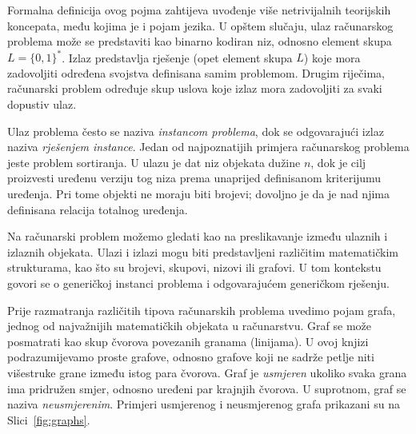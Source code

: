 Formalna definicija ovog pojma zahtijeva uvođenje više netrivijalnih teorijskih koncepata, među kojima je i pojam jezika. U opštem slučaju, ulaz računarskog problema može se predstaviti kao binarno kodiran niz, odnosno element skupa $L=\{0,1\}^*$. Izlaz predstavlja rješenje (opet element skupa $L$) koje mora zadovoljiti određena svojstva definisana samim problemom. Drugim riječima, računarski problem određuje skup uslova koje izlaz mora zadovoljiti za svaki dopustiv ulaz.

Ulaz problema često se naziva \textit{instancom problema}, dok se odgovarajući izlaz naziva \textit{rješenjem instance}. Jedan od najpoznatijih primjera računarskog problema jeste problem sortiranja. U ulazu je dat niz objekata dužine $n$, dok je cilj proizvesti uređenu verziju tog niza prema unaprijed definisanom kriterijumu uređenja. Pri tome objekti ne moraju biti brojevi; dovoljno je da je nad njima definisana relacija totalnog uređenja.

Na računarski problem možemo gledati kao na preslikavanje između ulaznih i izlaznih objekata. Ulazi i izlazi mogu biti predstavljeni različitim matematičkim strukturama, kao što su brojevi, skupovi, nizovi ili grafovi. U tom kontekstu govori se o generičkoj instanci problema i odgovarajućem generičkom rješenju.

Prije razmatranja različitih tipova računarskih problema uvedimo pojam grafa, jednog od najvažnijih matematičkih objekata u računarstvu. Graf se može posmatrati kao skup čvorova povezanih granama (linijama). U ovoj knjizi podrazumijevamo proste grafove, odnosno grafove koji ne sadrže petlje niti višestruke grane između istog para čvorova. Graf je \textit{usmjeren} ukoliko svaka grana ima pridružen smjer, odnosno uređeni par krajnjih čvorova. U suprotnom, graf se naziva \textit{neusmjerenim}. Primjeri usmjerenog i neusmjerenog grafa prikazani su na Slici~\ref{fig:graphs}.


